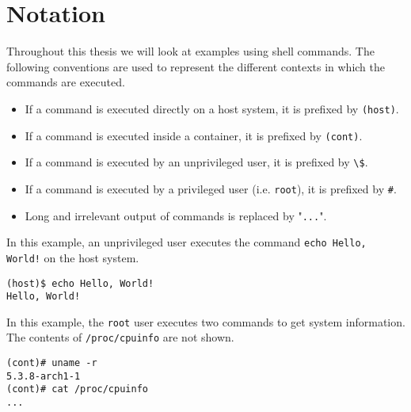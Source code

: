 \chapter{Notation}
Throughout this thesis we will look at examples using shell commands. The following conventions are used to represent the different contexts in which the commands are executed.

\begin{itemize}
    \item If a command is executed directly on a host system, it is prefixed by \lstinline{(host)}.
    \item If a command is executed inside a container, it is prefixed by \lstinline{(cont)}.
    \item If a command is executed by an unprivileged user, it is prefixed by \lstinline{\$}.
    \item If a command is executed by a privileged user (i.e. \lstinline{root}), it is prefixed by \lstinline{#}.
    \item Long and irrelevant output of commands is replaced by "\lstinline{...}".
\end{itemize}

In this example, an unprivileged user executes the command \lstinline{echo Hello, World!} on the host system.
\begin{lstlisting}[caption={Shell command notation example 1}, captionpos=b]
(host)$ echo Hello, World!
Hello, World!
\end{lstlisting}

\hfill

In this example, the \lstinline{root} user executes two commands to get system information. The contents of \lstinline{/proc/cpuinfo} are not shown.
\begin{lstlisting}[caption={Shell command notation example 2}, captionpos=b]
(cont)# uname -r
5.3.8-arch1-1
(cont)# cat /proc/cpuinfo
...
\end{lstlisting}
